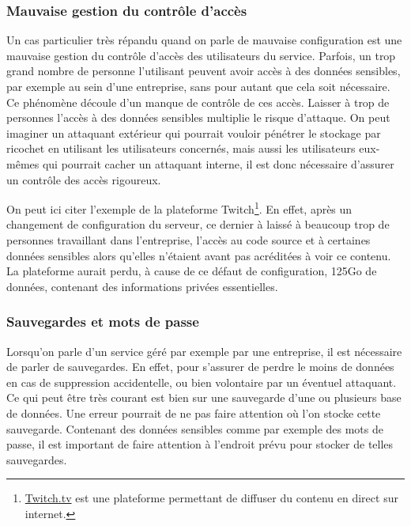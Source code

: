 \documentclass[a4paper, 12pt]{article}
\begin{document}
\begin{spacing}{1.1}
      \subsubsection{Mauvaise gestion du contrôle d'accès}
        Un cas particulier très répandu quand on parle de mauvaise configuration
        est une mauvaise gestion du contrôle d'accès des utilisateurs du
        service. Parfois, un trop grand nombre de personne l'utilisant peuvent
        avoir accès à des données sensibles, par exemple au sein d'une
        entreprise, sans pour autant que cela soit nécessaire. Ce phénomène
        découle d'un manque de contrôle de ces accès. Laisser à trop de
        personnes l'accès à des données sensibles multiplie le risque d'attaque.
        On peut imaginer un attaquant extérieur qui pourrait vouloir pénétrer le
        stockage par ricochet en utilisant les utilisateurs concernés, mais
        aussi les utilisateurs eux-mêmes qui pourrait cacher un attaquant
        interne, il est donc nécessaire d'assurer un contrôle des accès
        rigoureux.

        On peut ici citer l'exemple de la plateforme Twitch\footnote{
        \url{Twitch.tv} est une plateforme permettant de diffuser du contenu en
        direct sur internet.}. En effet, après un changement de configuration du
        serveur, ce dernier à laissé à beaucoup trop de personnes travaillant
        dans l'entreprise, l'accès au code source et à certaines données
        sensibles alors qu'elles n'étaient avant pas acréditées à voir ce
        contenu. La plateforme aurait perdu, à cause de ce défaut de
        configuration, 125Go de données, contenant des informations privées
        essentielles.

      \subsubsection{Sauvegardes et mots de passe}
        Lorsqu'on parle d'un service géré par exemple par une entreprise, il est
        nécessaire de parler de sauvegardes. En effet, pour s'assurer de perdre
        le moins de données en cas de suppression accidentelle, ou bien
        volontaire par un éventuel attaquant. Ce qui peut être très courant est
        bien sur une sauvegarde d'une ou plusieurs base de données. Une erreur
        pourrait de ne pas faire attention où l'on stocke cette sauvegarde.
        Contenant des données sensibles comme par exemple des mots de passe,
        il est important de faire attention à l'endroit prévu pour stocker de
        telles sauvegardes.


\end{spacing}
\end{document}
